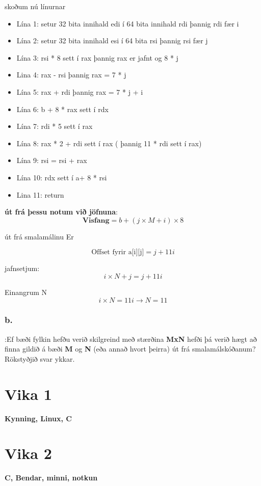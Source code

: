 \documentclass{article}
\begin{document}
skoðum nú línurnar
\begin{itemize}
    \item Lína 1: setur 32 bita innihald edi í 64 bita innihald rdi þannig rdi fær i
    \item Lína 2: setur 32 bita innihald esi í 64 bita rsi þannig rsi fær j
    \item Lína 3: rsi * 8 sett í rax þannig rax er jafnt og 8 * j
    \item Lina 4: rax - rsi þannig rax = 7 * j
    \item Lína 5: rax + rdi þannig rax = 7 * j + i
    \item Lína 6: b + 8 * rax sett í rdx
    \item Lína 7: rdi * 5 sett í rax
    \item Lína 8: rax * 2 + rdi sett í rax ( þannig 11 * rdi sett í rax)
    \item Lína 9: rsi = rsi + rax
    \item Lína 10: rdx sett í a+ 8 * rsi 
    \item Lina 11: return
\end{itemize}

\textbf{út frá þessu notum við jöfnuna}:
\[\textbf{Visfang} = b + ( j \times M + i) \times 8\]

út frá smalamálinu Er

\[\text{Offset fyrir a[i][j]} = j + 11i\]

jafnsetjum: 
\[ i \times N + j = j + 11 i\]

Einangrum N
\[ i \times N = 11i \rightarrow N = 11 \]



\subsubsection{b.}:Ef bæði fylkin hefðu verið skilgreind með stærðina \textbf{MxN} hefði þá verið hægt að
finna gildið á bæði \textbf{M} og \textbf{N} (eða annað hvort þeirra) út frá smalamálskóðanum?
Rökstyðjið svar ykkar.

\section{Vika 1}
\large{\textbf{Kynning, Linux, C}}


\section{Vika 2}
\large{\textbf{C, Bendar, minni, notkun}}
\end{document}
